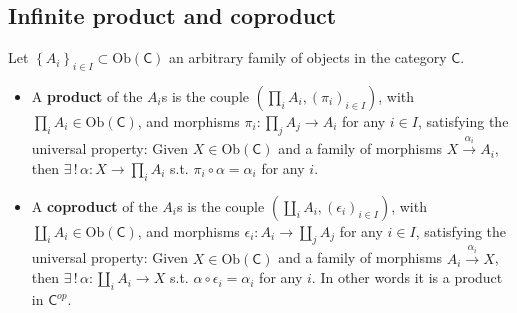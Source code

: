 \subsection{Infinite product and coproduct}

\begin{defn}
	Let $\left\{ A_i \right\}_{i \in I} \subset \mathrm{Ob} \left(\mathsf{C}\right)$ an arbitrary family of objects in the category $\mathsf{C}$.
	 \begin{itemize}
		 \item A \textbf{product} of the $A_i$s is the couple $\left(\prod_i A_i, (\pi_i)_{i \in I} \right)$, with $\prod_i A_i \in \mathrm{Ob} \left(\mathsf{C}\right)$, and morphisms $\pi_i: \prod_j A_j \to A_i$ for any $i \in I$, satisfying the universal property:
			 Given $X \in \mathrm{Ob} \left(\mathsf{C}\right)$ and a family of morphisms $X \xrightarrow{\alpha_i} A_i$, then $\exists\, !\, \alpha: X \to \prod_i A_i$ s.t. $\pi_i \circ \alpha = \alpha_i$ for any $i$.
		 \item A \textbf{coproduct} of the $A_i$s is the couple $\left(\coprod_i A_i, (\epsilon_i)_{i \in I} \right)$, with $\coprod_i A_i \in \mathrm{Ob} \left(\mathsf{C}\right)$, and morphisms $\epsilon_i: A_i \to \coprod_j A_j$ for any $i \in I$, satisfying the universal property:
			 Given $X \in \mathrm{Ob} \left(\mathsf{C}\right)$ and a family of morphisms $A_i \xrightarrow{\alpha_i} X$, then $\exists\, !\, \alpha: \coprod_i A_i \to X$ s.t. $\alpha \circ \epsilon_i = \alpha_i$ for any $i$.
			 In other words it is a product in $\mathsf{C}^{op}$.
	\end{itemize}
\end{defn}
 
